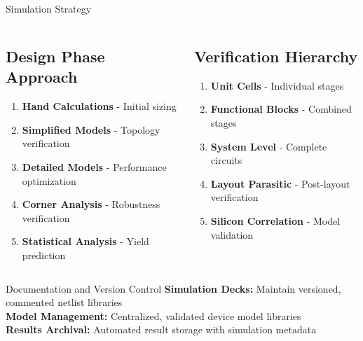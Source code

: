 \documentclass{beamer}
\begin{document}
\begin{frame}{Simulation Strategy}
    \begin{columns}
        \begin{column}{0.5\textwidth}
            \subsection{Design Phase Approach}
            \begin{enumerate}
                \item \textbf{Hand Calculations} - Initial sizing
                \item \textbf{Simplified Models} - Topology verification
                \item \textbf{Detailed Models} - Performance optimization
                \item \textbf{Corner Analysis} - Robustness verification
                \item \textbf{Statistical Analysis} - Yield prediction
            \end{enumerate}
        \end{column}
        \begin{column}{0.5\textwidth}
            \subsection{Verification Hierarchy}
            \begin{enumerate}
                \item \textbf{Unit Cells} - Individual stages
                \item \textbf{Functional Blocks} - Combined stages
                \item \textbf{System Level} - Complete circuits
                \item \textbf{Layout Parasitic} - Post-layout verification
                \item \textbf{Silicon Correlation} - Model validation
            \end{enumerate}
        \end{column}
    \end{columns}
    
    \begin{alertblock}{Documentation and Version Control}
        \textbf{Simulation Decks:} Maintain versioned, commented netlist libraries \\
        \textbf{Model Management:} Centralized, validated device model libraries \\
        \textbf{Results Archival:} Automated result storage with simulation metadata
    \end{alertblock}
\end{frame}
\end{document}
